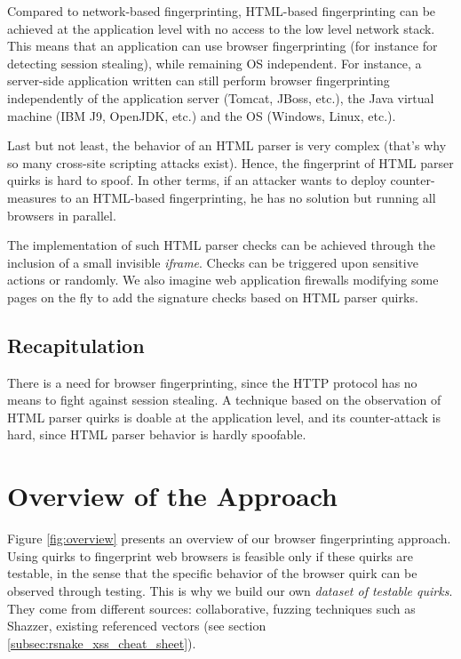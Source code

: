 \documentclass[10pt]{IEEEtran}
\begin{document}
Compared to network-based fingerprinting, HTML-based fingerprinting can be achieved 
at the application level with no access to the low level network stack. This means 
that an application can use browser fingerprinting 
(for instance for detecting session stealing), while remaining OS independent. 
For instance, a server-side application written can still perform browser 
fingerprinting independently of the application server (Tomcat, JBoss, etc.), 
the Java virtual machine (IBM J9, OpenJDK, etc.) and the OS (Windows, Linux, etc.). 




Last but not least, the behavior of an HTML parser is very complex (that's why so 
many cross-site scripting attacks exist). 
Hence, the fingerprint of HTML parser quirks is hard to spoof. 
In other terms, if an attacker wants to deploy counter-measures to an HTML-based 
fingerprinting, he has no solution but running all browsers in parallel.




The implementation of such  HTML parser checks can be achieved through the inclusion 
of a small invisible \emph{iframe}. 
Checks can be triggered upon sensitive actions or randomly.
We also  imagine web application firewalls modifying some pages on the fly to add 
the signature checks based on HTML parser quirks.




\subsection{Recapitulation}
There is a need for browser fingerprinting, since the HTTP protocol has no means to 
fight against session stealing.
A technique based on the observation of HTML parser quirks is doable at the 
application level, and its counter-attack is hard, 
since HTML parser behavior is hardly spoofable.




\section{Overview of the Approach}
\label{sec:overview}
Figure \ref{fig:overview} presents an overview of our browser fingerprinting approach.
Using quirks to fingerprint web browsers is feasible only if these
quirks are testable, in the sense that the specific behavior of the
browser quirk can be observed through testing. 
This is why we build our own \emph{dataset of testable quirks}. They come from different sources: collaborative,
fuzzing techniques such as Shazzer, existing referenced vectors 
(see section \ref{subsec:rsnake_xss_cheat_sheet}).
\end{document}
